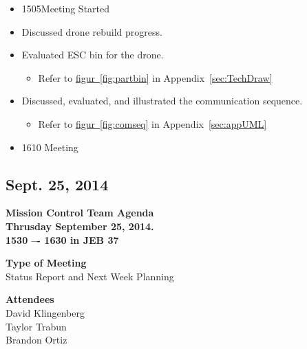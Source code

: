 \documentclass[pdftex,11pt]{article}
\begin{document}
\begin{itemize}
	\item 1505\indent  Meeting Started
	\item Discussed drone rebuild progress.
	\item Evaluated ESC bin for the drone.
	\begin{itemize}
		\item Refer to \hyperref[fig:partbin]{figur~\ref{fig:partbin}} in Appendix~\ref{sec:TechDraw}
	\end{itemize}  
	\item Discussed, evaluated, and illustrated the communication sequence.
	\begin{itemize}
		\item Refer to \hyperref[fig:comseq]{figur~\ref{fig:comseq}} in Appendix~\ref{sec:appUML}
	\end{itemize}
	\item 1610 \indent Meeting 
\end{itemize}


\subsection{Sept. 25, 2014}
{ \huge \bfseries Mission Control Team Agenda \\[0.4cm] }
{ \huge \bfseries Thrusday September 25, 2014.\\1530 –-  1630  in JEB 37\\[0.4cm] }
\vspace*{2.5mm}

{ \large \bfseries \hspace*{2 mm} Type of Meeting\\}
\hspace*{12 mm}  Status Report and  Next Week Planning
\vspace*{1.5mm}

{ \large \bfseries \hspace*{2 mm} Attendees\\}
\hspace*{12mm} David Klingenberg\\
\hspace*{12mm} Taylor Trabun\\
\hspace*{12mm} Brandon Ortiz\\
\vspace*{1.5mm}
\end{document}
